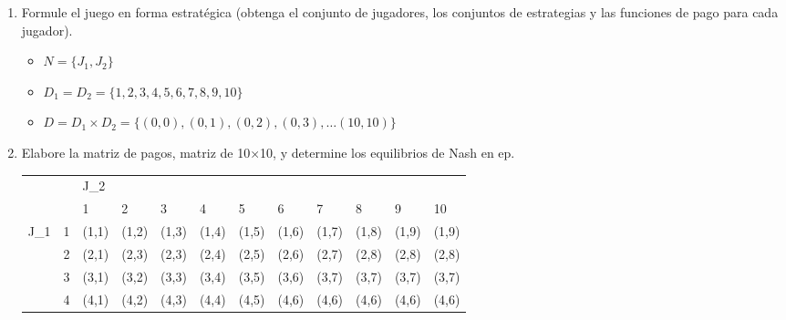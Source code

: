 \documentclass{homework}
\begin{document}
 \begin{enumerate}
    \item Formule el juego en forma estratégica (obtenga el conjunto de jugadores, los conjuntos de estrategias y las funciones de pago para cada jugador).
    \begin{itemize}
        \item $N=\{J_1, J_2\}$ 
        \item $D_1=D_2=\{1,2,3,4,5,6,7,8,9,10\}$
        \item $D=D_1\times D_2=\{(0,0), (0,1), (0,2), (0,3), … (10,10)\}$
    \end{itemize}
    \item Elabore la matriz de pagos, matriz de 10×10, y determine los equilibrios de Nash en ep.
    
\begin{tabular}{llllllllllll}
 &  & J_2 &  &  &  &  &  &  &  &  &  \\ \cline{3-12} 
 & \multicolumn{1}{l|}{} & \multicolumn{1}{l|}{1} & \multicolumn{1}{l|}{2} & \multicolumn{1}{l|}{3} & \multicolumn{1}{l|}{4} & \multicolumn{1}{l|}{5} & \multicolumn{1}{l|}{6} & \multicolumn{1}{l|}{7} & \multicolumn{1}{l|}{8} & \multicolumn{1}{l|}{9} & \multicolumn{1}{l|}{10} \\ \cline{2-12} 
\multicolumn{1}{l|}{J_1} & \multicolumn{1}{l|}{1} & \multicolumn{1}{l|}{(1,1)} & \multicolumn{1}{l|}{(1,2)} & \multicolumn{1}{l|}{(1,3)} & \multicolumn{1}{l|}{(1,4)} & \multicolumn{1}{l|}{(1,5)} & \multicolumn{1}{l|}{(1,6)} & \multicolumn{1}{l|}{(1,7)} & \multicolumn{1}{l|}{(1,8)} & \multicolumn{1}{l|}{(1,9)} & \multicolumn{1}{l|}{(1,9)} \\ \cline{2-12} 
\multicolumn{1}{l|}{} & \multicolumn{1}{l|}{2} & \multicolumn{1}{l|}{(2,1)} & \multicolumn{1}{l|}{(2,3)} & \multicolumn{1}{l|}{(2,3)} & \multicolumn{1}{l|}{(2,4)} & \multicolumn{1}{l|}{(2,5)} & \multicolumn{1}{l|}{(2,6)} & \multicolumn{1}{l|}{(2,7)} & \multicolumn{1}{l|}{(2,8)} & \multicolumn{1}{l|}{(2,8)} & \multicolumn{1}{l|}{(2,8)} \\ \cline{2-12} 
\multicolumn{1}{l|}{} & \multicolumn{1}{l|}{3} & \multicolumn{1}{l|}{(3,1)} & \multicolumn{1}{l|}{(3,2)} & \multicolumn{1}{l|}{(3,3)} & \multicolumn{1}{l|}{(3,4)} & \multicolumn{1}{l|}{(3,5)} & \multicolumn{1}{l|}{(3,6)} & \multicolumn{1}{l|}{(3,7)} & \multicolumn{1}{l|}{(3,7)} & \multicolumn{1}{l|}{(3,7)} & \multicolumn{1}{l|}{(3,7)} \\ \cline{2-12} 
\multicolumn{1}{l|}{} & \multicolumn{1}{l|}{4} & \multicolumn{1}{l|}{(4,1)} & \multicolumn{1}{l|}{(4,2)} & \multicolumn{1}{l|}{(4,3)} & \multicolumn{1}{l|}{(4,4)} & \multicolumn{1}{l|}{(4,5)} & \multicolumn{1}{l|}{(4,6)} & \multicolumn{1}{l|}{(4,6)} & \multicolumn{1}{l|}{(4,6)} & \multicolumn{1}{l|}{(4,6)} & \multicolumn{1}{l|}{(4,6)} \\ \cline{2-12} 

\end{tabular}
\end{enumerate}
\end{document}
